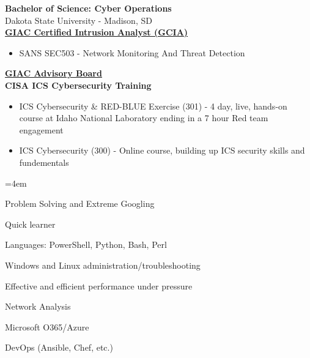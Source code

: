 \documentclass[a4paper,10pt]{article}
\begin{document}
\textbf{Bachelor of Science: Cyber Operations} \\
Dakota State University - Madison, SD \\
\href{https://www.credly.com/badges/87563fff-910c-449c-ab21-f571b162cd4b/public_url}{\textbf{GIAC Certified Intrusion Analyst (GCIA)}}
\begin{itemize}
    \small
    \leftskip=4em
    \item SANS SEC503 - Network Monitoring And Threat Detection
\end{itemize}
\href{https://www.credly.com/badges/a65cec63-e07c-4e52-b154-842564aadf65/public_url}{\textbf{GIAC Advisory Board}} \\
\textbf{CISA ICS Cybersecurity Training}
\begin{itemize}
    \small
    \leftskip=4em
    \item ICS Cybersecurity \& RED-BLUE Exercise (301) - 4 day, live, hands-on course at Idaho National Laboratory ending in a 7 hour Red team engagement 
    \item ICS Cybersecurity (300) - Online course, building up ICS security skills and fundementals
\end{itemize}
\begin{itemize}
    \begin{multicols}{2}
    \small
    \leftskip=4em
    \item Problem Solving and Extreme Googling
    \item Quick learner
    \item Languages: PowerShell, Python, Bash, Perl
    \item Windows and Linux administration/troubleshooting
    \item Effective and efficient performance under pressure
    \item Network Analysis
    \item Microsoft O365/Azure
    \item DevOps (Ansible, Chef, etc.)
    \end{multicols}
\end{itemize}
\end{document}
